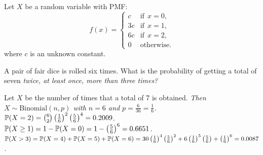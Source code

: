 \begin{exercise}
\begin{questions}
\question
Let $X$ be a random variable with PMF:
\[
f(x) = \begin{cases}
	c		& \text{if}\ \ x=0, \\
	3c		& \text{if}\ \ x=1, \\
	6c		& \text{if}\ \ x=2, \\
	0			& \text{otherwise.}
\end{cases}
\]
where $c$ is an unknown constant.



\question
A pair of fair dice is rolled six times. What is the probability of getting a total of seven
\ben
\it twice,
\it at least once,
\it more than three times?
\een
\begin{answer}
Let $X$ be the number of times that a total of 7 is obtained. 
\bit
\it Then $X\sim\text{Binomial}(n,p)$ with $n=6$ and $p=\frac{6}{36}=\frac{1}{6}$.
\eit
\ben
\it $\mathbb{P}(X=2) 
	= \binom{6}{2}\left(\frac{1}{6}\right)^2 \left(\frac{5}{6}\right)^4 
	= 0.2009$.
\it $\mathbb{P}(X\geq 1) 
	= 1 - \mathbb{P}(X=0) 
	= 1 - \left(\frac{5}{6}\right)^6 
	= 0.6651$.
\it $\mathbb{P}(X>3)
	= \mathbb{P}(X=4) + \mathbb{P}(X=5) +\mathbb{P}(X=6)
	= 30\left(\frac{1}{6}\right)^4 \left(\frac{5}{6}\right)^2
		+ 6\left(\frac{1}{6}\right)^5 \left(\frac{5}{6}\right) 
		+ \left(\frac{1}{6}\right)^6 
	= 0.0087$.
\een
\end{answer}

\end{questions}
\end{exercise}
\endinput
